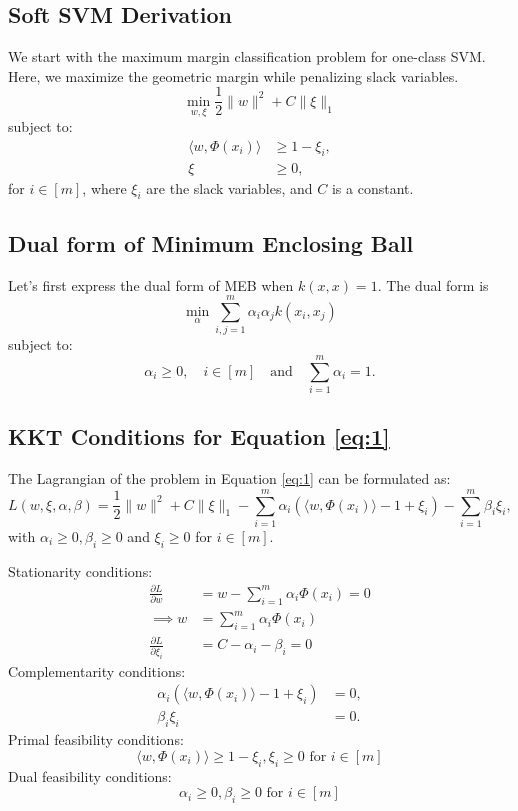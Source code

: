 \documentclass{article}
\begin{document}
\subsection{Soft SVM Derivation}
We start with the maximum margin classification problem for one-class SVM.
Here, we maximize the geometric margin while penalizing slack variables.
\begin{equation}\label{eq:1}
\min_{w, \xi} \frac{1}{2} \|w\|^2 + C\|\xi\|_1
\end{equation}
subject to:
\begin{align*}
\langle w, \Phi(x_i)\rangle &\geq 1 - \xi_i, \\
\xi &\geq 0,
\end{align*}
for $i \in [m]$, where $\xi_i$ are the slack variables, and $C$ is a constant.

\subsection{Dual form of Minimum Enclosing Ball}
Let's first express the dual form of MEB when $k(x, x) = 1$.
The dual form is
$$\min_\alpha \sum_{i, j=1}^{m} \alpha_i \alpha_j k(x_i, x_j)$$
subject to:
$$\alpha_i \geq 0, \quad i \in [m] \quad \text{and} \quad \sum_{i=1}^{m} \alpha_i = 1.$$

\subsection{KKT Conditions for Equation \ref{eq:1}}
The Lagrangian of the problem in Equation \ref{eq:1} can be formulated as:
$$L(w, \xi, \alpha, \beta) = \frac{1}{2}\|w\|^2 + C\|\xi\|_1 - \sum_{i=1}^{m} \alpha_i (\langle w, \Phi(x_i) \rangle - 1 + \xi_i) - \sum_{i=1}^{m} \beta_i \xi_i,$$
with $\alpha_i \geq 0, \beta_i \geq 0$ and $\xi_i \geq 0$ for $i \in [m]$.

Stationarity conditions:
\begin{align*}
\frac{\partial L}{\partial w} &= w - \sum_{i=1}^{m} \alpha_i \Phi(x_i) = 0 \\
\implies w &= \sum_{i=1}^{m} \alpha_i \Phi(x_i) \\
\frac{\partial L}{\partial \xi_i} &= C - \alpha_i - \beta_i = 0
\end{align*}
Complementarity conditions:
\begin{align*}
\alpha_i (\langle w, \Phi(x_i) \rangle - 1 + \xi_i) &= 0, \\
\beta_i \xi_i &= 0.
\end{align*}
Primal feasibility conditions:
$$\langle w, \Phi(x_i) \rangle \geq 1 - \xi_i, \xi_i \geq 0 \text{ for } i \in [m]$$
Dual feasibility conditions:
$$\alpha_i \geq 0, \beta_i \geq 0 \text{ for } i \in [m]$$
\end{document}
